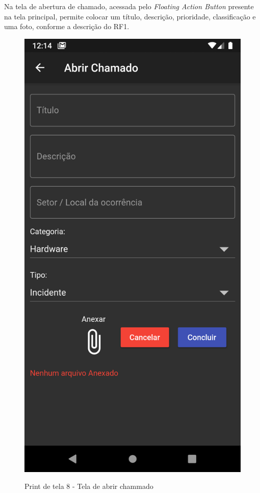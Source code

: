  Na tela de abertura de chamado, acessada pelo \textit{Floating Action Button} presente na tela principal, permite colocar um título, descrição, prioridade, classificação e uma foto, conforme a descrição do RF1.
 \begin{figure}[htb]
     \caption{Print de tela 8 - Tela de abrir chammado}
     \centering
     \begin{frame}{
     \includegraphics [scale = 0.2]{img/screenshots/7_abrir_chamado.png}}
     \end{frame}
     \label{fig:7_abrir_chamado}
 \end{figure}
 

